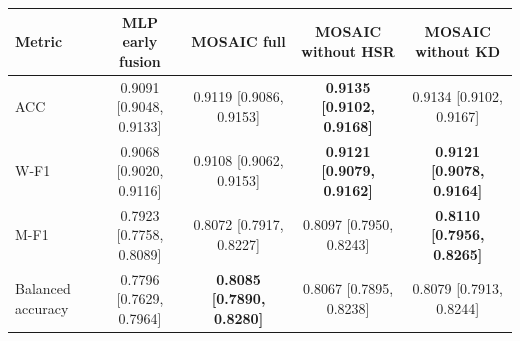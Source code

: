 \begin{tabular}{lcccc}
\toprule
Metric & MLP early fusion & MOSAIC full & MOSAIC without HSR & MOSAIC without KD \\
\midrule
ACC & 0.9091 [0.9048, 0.9133] & 0.9119 [0.9086, 0.9153] & \textbf{0.9135 [0.9102, 0.9168]} & 0.9134 [0.9102, 0.9167] \\
W-F1 & 0.9068 [0.9020, 0.9116] & 0.9108 [0.9062, 0.9153] & \textbf{0.9121 [0.9079, 0.9162]} & \textbf{0.9121 [0.9078, 0.9164]} \\
M-F1 & 0.7923 [0.7758, 0.8089] & 0.8072 [0.7917, 0.8227] & 0.8097 [0.7950, 0.8243] & \textbf{0.8110 [0.7956, 0.8265]} \\
Balanced accuracy & 0.7796 [0.7629, 0.7964] & \textbf{0.8085 [0.7890, 0.8280]} & 0.8067 [0.7895, 0.8238] & 0.8079 [0.7913, 0.8244] \\
\bottomrule
\end{tabular}
